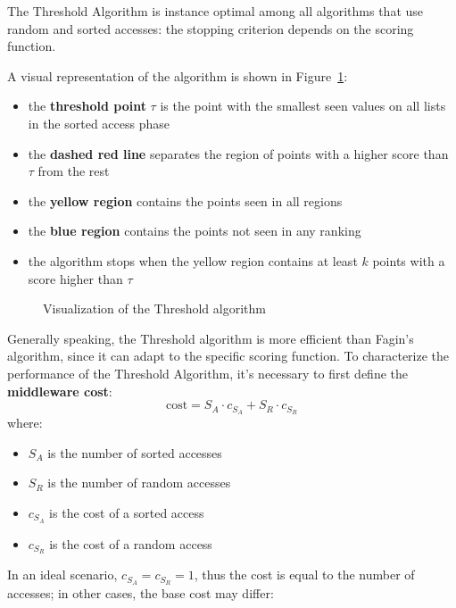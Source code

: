 \documentclass[english]{article}
\begin{document}
The Threshold Algorithm is instance optimal among all algorithms that use random and sorted accesses:
the stopping criterion depends on the scoring function.

A visual representation of the algorithm is shown in Figure~\ref{fig:treshold-algorithm}:

\begin{itemize}
  \item the \textbf{threshold point} \(\tau\) is the point with the smallest seen values on all lists in the sorted access phase
  \item the \textbf{dashed red line} separates the region of points with a higher score than \(\tau\) from the rest
  \item the \textbf{yellow region} contains the points seen in all regions
  \item the \textbf{blue region} contains the points not seen in any ranking
  \item the algorithm stops when the yellow region contains at least \(k\) points with a score higher than \(\tau\)
\end{itemize}

\begin{figure}[htbp]
  \centering
  \bigskip
  \caption{Visualization of the Threshold algorithm}
  \label{fig:treshold-algorithm}
  \bigskip
\end{figure}

Generally speaking, the Threshold algorithm is more efficient than Fagin's algorithm, since it can adapt to the specific scoring function.
To characterize the performance of the Threshold Algorithm, it's necessary to first define the \textbf{middleware cost}:
\[ \text{cost} = S_A \cdot c_{S_A} + S_R \cdot c_{S_R} \]
where:
\begin{itemize}
  \item \(S_A\) is the number of sorted accesses
  \item \(S_R\) is the number of random accesses
  \item \(c_{S_A}\) is the cost of a sorted access
  \item \(c_{S_R}\) is the cost of a random access
\end{itemize}

In an ideal scenario, \(c_{S_A} = c_{S_R} = 1\), thus the cost is equal to the number of accesses;
in other cases, the base cost may differ:
\end{document}
